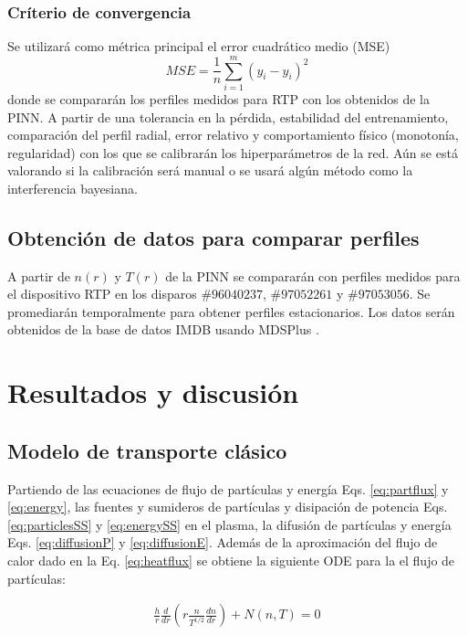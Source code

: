 \subsubsection{Críterio de convergencia}
\vspace{- 2 mm}
Se utilizará como métrica principal el error cuadrático medio (MSE)
\vspace{- 3 mm} 
\begin{equation}
MSE = \frac{1}{n}\sum\limits_{i = 1}^m(y_i - \hat{y}_i)^2
\end{equation}
donde se compararán los perfiles medidos para RTP con los obtenidos de la PINN. A partir de una tolerancia en la pérdida, estabilidad del entrenamiento, comparación del perfil radial, error relativo y comportamiento físico (monotonía, regularidad) con los que se calibrarán los hiperparámetros de la red. Aún se está valorando si la calibración será manual o se usará algún método como la interferencia bayesiana.
\vspace{- 5 mm}
\subsection{Obtención de datos para comparar perfiles}
A partir de $n(r)$ y $T(r)$ de la PINN se compararán con perfiles medidos para el dispositivo RTP en los disparos $\#96040237$, $\#97052261$ y $\#97053056$. Se promediarán temporalmente para obtener perfiles estacionarios. Los datos serán obtenidos de la base de datos IMDB \cite{roach2008} usando MDSPlus \cite{stillerman1997}.

\section{Resultados y discusión}

\subsection{Modelo de transporte clásico}

Partiendo de las ecuaciones de flujo de partículas y energía Eqs. \eqref{eq:partflux} y \eqref{eq:energy}, las fuentes y sumideros de partículas y disipación de potencia Eqs. \eqref{eq:particlesSS} y \eqref{eq:energySS} en el plasma, la difusión de partículas y energía Eqs. \eqref{eq:diffusionP} y \eqref{eq:diffusionE}. Además de la aproximación del flujo de calor dado en la Eq. \eqref{eq:heatflux} se obtiene la siguiente ODE para la el flujo de partículas:

\begin{eqnarray}\label{eq:partODE}
	\frac{h}{r}\frac{d}{dr}\left(r\frac{n}{T^{1/2}}\frac{dn}{dr}\right) + N(n, T) = 0
\end{eqnarray}

